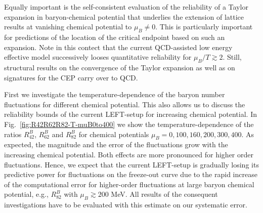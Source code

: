 \documentclass[%
reprint,
superscriptaddress,
showpacs,preprintnumbers,
amsmath,amssymb,
aps,
prd,
]{revtex4-1}
\def\Fig#1{Fig.~\ref{#1}} \def\Tab#1{Tab.~\ref{#1}}
\begin{document}
Equally important is the self-consistent evaluation of the reliability of a Taylor expansion in baryon-chemical potential that underlies the extension of lattice results at vanishing chemical potential to $\mu_B\neq 0$. This is particularly important for predictions of the location of the critical endpoint based on such an expansion. Note in this contect that the current QCD-assisted low energy effective model successively looses quantitative reliability for $\mu_B/T\gtrsim 2$. Still,  structural results on the convergence of the Taylor expansion as well as on signatures for the CEP carry over to QCD. 

First we investigate the temperature-dependence of the baryon number fluctuations for different chemical potential. This also allows us to discuss the reliability bounds of the current LEFT-setup for increasing chemical potential. In \Fig{fig:R42R62R82-T-muB0to400} we show the temperature-dependence of the ratios $R^{B}_{42}$, $R^{B}_{62}$ and $R^{B}_{82}$ for chemical potentials $\mu_B=0, 100, 160, 200, 300, 400$. As expected, the magnitude and the error of the fluctuations grow with the increasing chemical potential. Both effects are more pronounced for higher order fluctuations. Hence, we expect that the current LEFT-setup is gradually losing its predictive power for fluctuations on the freeze-out curve 
due  to the rapid increase of the computational error for higher-order fluctuations at large baryon chemical potential, e.g., $R^{B}_{82}$ with $\mu_B\gtrsim 200$ MeV. All results of the consequent investigations have to be evaluated with this estimate on our systematic error.  
\end{document}

